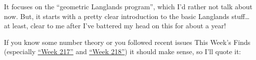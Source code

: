 \documentclass{article}
\def\tightlist{}
\renewcommand{\texttt}[1]{%
  \begingroup
  \ttfamily
  \begingroup\lccode`~=`/\lowercase{\endgroup\def~}{/\discretionary{}{}{}}%
  \begingroup\lccode`~=`[\lowercase{\endgroup\def~}{[\discretionary{}{}{}}%
  \begingroup\lccode`~=`.\lowercase{\endgroup\def~}{.\discretionary{}{}{}}%
  \catcode`/=\active\catcode`[=\active\catcode`.=\active
  \scantokens{#1\noexpand}%
  \endgroup
}
\begin{document}

It focuses on the ``geometric Langlands program'', which I'd rather not
talk about now. But, it starts with a pretty clear introduction to the
basic Langlands stuff\ldots{} at least, clear to me after I've battered
my head on this for about a year!

If you know some number theory or you followed recent issues This Week's
Finds (especially \protect\hyperlink{week217}{``Week 217''} and
\protect\hyperlink{week218}{``Week 218''}) it should make sense, so I'll
quote it:
\end{document}

